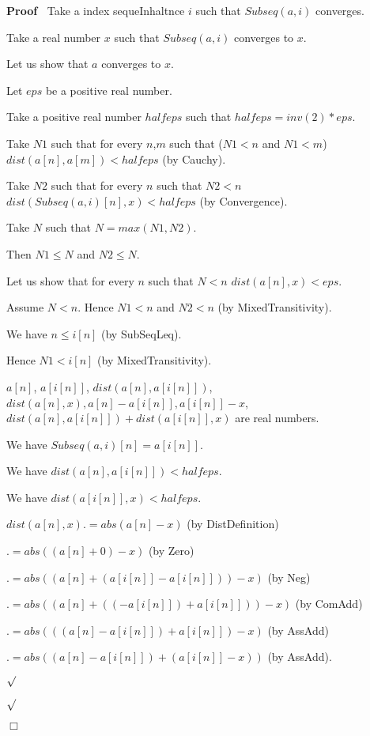 \documentclass{article}
\newenvironment{forthel}{\begin{leftbar}}{\end{leftbar}}
\newenvironment{proof}{\noindent\textbf{Proof\ }}{\hspace*{\fill}$\Box$\medskip}
\newenvironment{subproof}{\begin{list}{}{}
		\item[\text{Proof}]}{\hfill $\surd$ \end{list}}
\begin{document}
\begin{forthel}
	\begin{proof}
		Take a index sequeInhaltnce $i$ such that $Subseq(a,i)$ converges.
		
		Take a real number $x$ such that $Subseq(a,i)$ converges to $x$.
		
		Let us show that $a$ converges to $x$.
		
		\begin{subproof}
			Let $eps$ be a positive real number.
			
			Take a positive real number $halfeps$ such that $halfeps = inv(2) * eps$.
			
			Take $N1$ such that for every $n$,$m$ such that ($N1 < n$ and $N1 < m$) $dist(a[n],a[m]) < halfeps$ (by Cauchy).
			
			Take $N2$ such that for every $n$ such that $N2 < n$ $dist(Subseq(a,i)[n],x) < halfeps$ (by Convergence).
			
			Take $N$ such that $N = max(N1,N2)$.
			
			Then $N1 \leq N$ and $N2 \leq N$.
			
			Let us show that for every $n$ such that $N < n$ $dist(a[n],x) < eps$.
			
			\begin{subproof}
				Assume $N < n$. Hence $N1 < n$ and $N2 < n$ (by MixedTransitivity).
				
				We have $n \leq i[n]$ (by SubSeqLeq).
				
				Hence $N1 < i[n]$ (by MixedTransitivity).
				
				$a[n]$, $a[i[n]]$, $dist(a[n],a[i[n]])$, $dist(a[n],x), a[n] - a[i[n]], a[i[n]] - x$, $dist(a[n],a[i[n]]) + dist(a[i[n]],x)$ are real numbers.
				
				We have $Subseq(a,i)[n] = a[i[n]]$.
				
				We have $dist(a[n],a[i[n]]) < halfeps$.
				
				We have $dist(a[i[n]],x) < halfeps$.
				
				$dist(a[n],x) .= abs(a[n] - x)$ (by DistDefinition)
				
				$.= abs((a[n] + 0) - x)$ (by Zero)
				
				$.= abs((a[n] + (a[i[n]] - a[i[n]])) - x)$ (by Neg)
				
				$.= abs((a[n] + ((-a[i[n]]) + a[i[n]])) - x)$ (by ComAdd)
				
				$.= abs(((a[n] - a[i[n]]) + a[i[n]]) - x)$ (by AssAdd)
				
				$.= abs((a[n] - a[i[n]]) + (a[i[n]] - x))$ (by AssAdd).
				

\end{subproof}
\end{subproof}
\end{proof}
\end{forthel}
\end{document}
